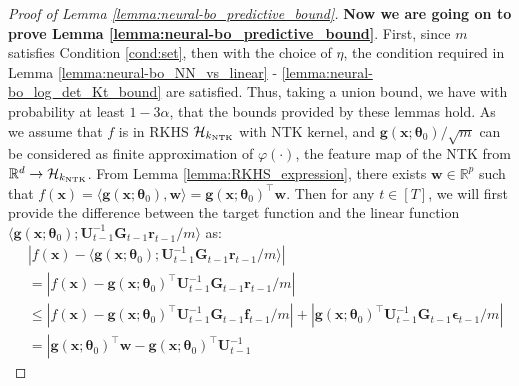 \begin{proof}[Proof of Lemma \ref{lemma:neural-bo_predictive_bound}]
\noindent \textbf{Now we are going on to prove Lemma \ref{lemma:neural-bo_predictive_bound}}. First, since $m$ satisfies Condition \ref{cond:set}, then with the choice of $\eta$, the condition required in Lemma \ref{lemma:neural-bo_NN_vs_linear} - \ref{lemma:neural-bo_log_det_Kt_bound} are satisfied. Thus, taking a union bound, we have with probability at least $1 - 3\alpha$, that the bounds provided by these lemmas hold. 
As we assume that $f$ is in RKHS $\mathcal{H}_{k_\textup{NTK}}$ with NTK kernel, and $\mathbf{g}(\mathbf{x}; \boldsymbol{\theta}_0)/\sqrt{m}$  can be considered as finite approximation of $\varphi(\cdot)$, the feature map of the NTK from $\mathbb{R}^d \rightarrow \mathcal{H}_{k_\textup{NTK}}$. From Lemma \ref{lemma:RKHS_expression}, there exists $\mathbf{w} \in \mathbb{R}^p$ such that $f(\mathbf{x}) = \langle \mathbf{g}(\mathbf{x}; \boldsymbol{\theta}_0), \mathbf{w} \rangle = \mathbf{g}(\mathbf{x}; \boldsymbol{\theta}_0)^\top \mathbf{w}$. 
Then for any $t \in [T]$, we will first provide the difference between the target function and the linear function
$\langle \mathbf{g}(\mathbf{x}; \boldsymbol{\theta}_0); \mathbf{U}^{-1}_{t-1} \mathbf{G}_{t-1} \mathbf{r}_{t-1}/m \rangle$ as:
\begin{equation}
\label{ieqn:neural-bo_confidence_interval}
    \begin{split}
         & \left \lvert f(\mathbf{x}) - \langle \mathbf{g}(\mathbf{x}; \boldsymbol{\theta}_0); \mathbf{U}^{-1}_{t-1} \mathbf{G}_{t-1} \mathbf{r}_{t-1}/m \rangle   \right \rvert  \\
        & = \left\lvert f(\mathbf{x}) - \mathbf{g}(\mathbf{x}; \boldsymbol{\theta}_0)^\top  \mathbf{U}^{-1}_{t-1} \mathbf{G}_{t-1} \mathbf{r}_{t-1}/m \right\rvert \\
        & \leq \left\lvert f(\mathbf{x}) - \mathbf{g}(\mathbf{x}; \boldsymbol{\theta}_0)^\top  \mathbf{U}^{-1}_{t-1}
        \mathbf{G}_{t-1}\mathbf{f}_{t-1}/m \right\rvert + 
        \left\lvert \mathbf{g}(\mathbf{x}; \boldsymbol{\theta}_0)^\top \mathbf{U}^{-1}_{t-1}
        \mathbf{G}_{t-1} \boldsymbol{\epsilon}_{t-1}/m \right\rvert\\
        & = \left\lvert \mathbf{g}(\mathbf{x}; \boldsymbol{\theta}_0)^\top \mathbf{w} - \mathbf{g}(\mathbf{x}; \boldsymbol{\theta}_0)^\top  \mathbf{U}^{-1}_{t-1} 

\end{split}
\end{equation}
\end{proof}
